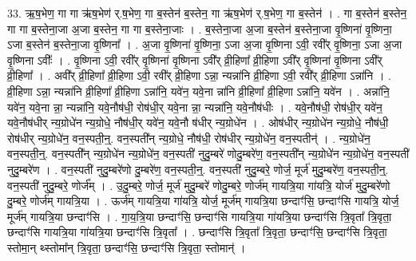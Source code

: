 \documentclass[17pt]{extarticle}
\begin{document}
33. ऋ॒ष॒भेण॒ गा गा ऋ॑ष॒भेण॑ र्.ष॒भेण॒ गा ब॒स्तेन॑ ब॒स्तेन॒ गा ऋ॑ष॒भेण॑ र्.ष॒भेण॒ गा ब॒स्तेन॑ । . गा ब॒स्तेन॑ ब॒स्तेन॒ गा गा ब॒स्तेना॒जा अ॒जा ब॒स्तेन॒ गा गा ब॒स्तेना॒जाः । . ब॒स्तेना॒जा अ॒जा ब॒स्तेन॑ ब॒स्तेना॒जा वृ॒ष्णिना॑ वृ॒ष्णिना॒ ऽजा ब॒स्तेन॑ ब॒स्तेना॒जा वृ॒ष्णिना᳚ । . अ॒जा वृ॒ष्णिना॑ वृ॒ष्णिना॒ ऽजा अ॒जा वृ॒ष्णिना ऽवी॒ रवी᳚र् वृ॒ष्णिना॒ ऽजा अ॒जा वृ॒ष्णिना ऽवीः᳚ । . वृ॒ष्णिना ऽवी॒ रवी᳚र् वृ॒ष्णिना॑ वृ॒ष्णिना ऽवी᳚र् व्री॒हिणा᳚ व्री॒हिणा ऽवी᳚र् वृ॒ष्णिना॑ वृ॒ष्णिना ऽवी᳚र् व्री॒हिणा᳚ । . अवी᳚र् व्री॒हिणा᳚ व्री॒हिणा ऽवी॒ रवी᳚र् व्री॒हिणा ऽन्ना॒ न्यन्ना॑नि व्री॒हिणा ऽवी॒ रवी᳚र् व्री॒हिणा ऽन्ना॑नि । . व्री॒हिणा ऽन्ना॒ न्यन्ना॑नि व्री॒हिणा᳚ व्री॒हिणा ऽन्ना॑नि॒ यवे॑न॒ यवे॒ना न्ना॑नि व्री॒हिणा᳚ व्री॒हिणा ऽन्ना॑नि॒ यवे॑न । . अन्ना॑नि॒ यवे॑न॒ यवे॒ना न्ना॒ न्यन्ना॑नि॒ यवे॒नौष॑धी॒ रोष॑धी॒र् यवे॒ना न्ना॒ न्यन्ना॑नि॒ यवे॒नौष॑धीः । . यवे॒नौष॑धी॒ रोष॑धी॒र् यवे॑न॒ यवे॒नौष॑धीर् न्य॒ग्रोधे॑न न्य॒ग्रोधे॒ नौष॑धी॒र् यवे॑न॒ यवे॒नौ ष॑धीर् न्य॒ग्रोधे॑न । . ओष॑धीर् न्य॒ग्रोधे॑न न्य॒ग्रोधे॒ नौष॑धी॒ रोष॑धीर् न्य॒ग्रोधे॑न॒ वन॒स्पती॒न्॒. 
वन॒स्पती᳚न् न्य॒ग्रोधे॒ नौष॑धी॒ रोष॑धीर् न्य॒ग्रोधे॑न॒ वन॒स्पतीन्॑ । . न्य॒ग्रोधे॑न॒ वन॒स्पती॒न्॒. वन॒स्पती᳚न् न्य॒ग्रोधे॑न न्य॒ग्रोधे॑न॒ वन॒स्पती॑ नुदु॒म्बरे॑ णोदु॒म्बरे॑ण॒ वन॒स्पती᳚न् न्य॒ग्रोधे॑न न्य॒ग्रोधे॑न॒ वन॒स्पती॑ नुदु॒म्बरे॑ण । . वन॒स्पती॑ नुदु॒म्बरे॑णो दु॒म्बरे॑ण॒ वन॒स्पती॒न्॒. वन॒स्पती॑ नुदु॒म्बरे॒ णोर्ज॒ मूर्ज॑ मुदु॒म्बरे॑ण॒ वन॒स्पती॒न्॒. वन॒स्पती॑ नुदु॒म्बरे॒ णोर्ज᳚म् । . उ॒दु॒म्बरे॒ णोर्ज॒ मूर्ज॑ मुदु॒म्बरे॑ णोदु॒म्बरे॒ णोर्ज॑म् गायत्रि॒या गा॑यत्रि॒ योर्ज॑ मुदु॒म्बरे॑णो दु॒म्बरे॒ णोर्ज॑म् गायत्रि॒या । . ऊर्ज॑म् गायत्रि॒या गा॑यत्रि॒ योर्ज॒ मूर्ज॑म् गायत्रि॒या छन्दाꣳ॑सि॒ छन्दाꣳ॑सि गायत्रि॒ योर्ज॒ मूर्ज॑म् गायत्रि॒या छन्दाꣳ॑सि । . गा॒य॒त्रि॒या छन्दाꣳ॑सि॒ छन्दाꣳ॑सि गायत्रि॒या गा॑यत्रि॒या छन्दाꣳ॑सि त्रि॒वृता᳚ त्रि॒वृता॒ छन्दाꣳ॑सि गायत्रि॒या गा॑यत्रि॒या छन्दाꣳ॑सि त्रि॒वृता᳚ । . छन्दाꣳ॑सि त्रि॒वृता᳚ त्रि॒वृता॒ छन्दाꣳ॑सि॒ छन्दाꣳ॑सि त्रि॒वृता॒ स्तोमा॒न् थ्स्तोमा᳚न् त्रि॒वृता॒ छन्दाꣳ॑सि॒ छन्दाꣳ॑सि त्रि॒वृता॒ स्तोमान्॑ । \newline
\end{document}
